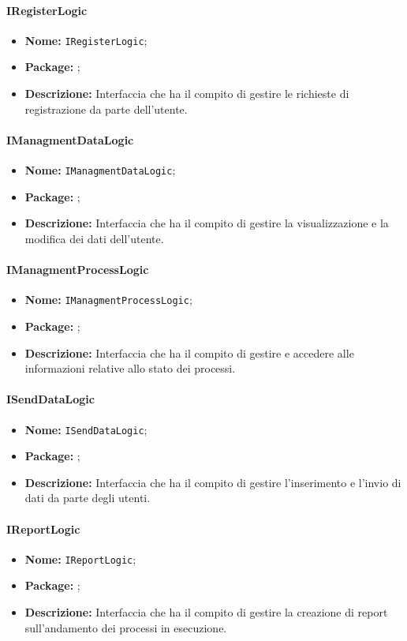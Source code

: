 \paragraph{IRegisterLogic}
\begin{itemize}
\item \textbf{Nome:} \texttt{IRegisterLogic};
\item \textbf{Package:} \texttt{\iLogicUser{}};
\item \textbf{Descrizione:} Interfaccia che ha il compito di gestire le richieste di registrazione da parte dell'utente.
\end{itemize}

\paragraph{IManagmentDataLogic}
\begin{itemize}
\item \textbf{Nome:} \texttt{IManagmentDataLogic};
\item \textbf{Package:} \texttt{\iLogicUser{}};
\item \textbf{Descrizione:} Interfaccia che ha il compito di gestire la visualizzazione e la modifica dei dati dell'utente.
\end{itemize}

\paragraph{IManagmentProcessLogic}
\begin{itemize}
\item \textbf{Nome:} \texttt{IManagmentProcessLogic};
\item \textbf{Package:} \texttt{\iLogicUser{}};
\item \textbf{Descrizione:} Interfaccia che ha il compito di gestire e accedere alle informazioni relative allo stato dei processi.
\end{itemize}

\paragraph{ISendDataLogic}
\begin{itemize}
\item \textbf{Nome:} \texttt{ISendDataLogic};
\item \textbf{Package:} \texttt{\iLogicUser{}};
\item \textbf{Descrizione:} Interfaccia che ha il compito di gestire l'inserimento e l'invio di dati da parte degli utenti.
\end{itemize}

\paragraph{IReportLogic}
\begin{itemize}
\item \textbf{Nome:} \texttt{IReportLogic};
\item \textbf{Package:} \texttt{\iLogicUser{}};
\item \textbf{Descrizione:} Interfaccia che ha il compito di gestire la creazione di report sull'andamento dei processi in esecuzione.
\end{itemize}